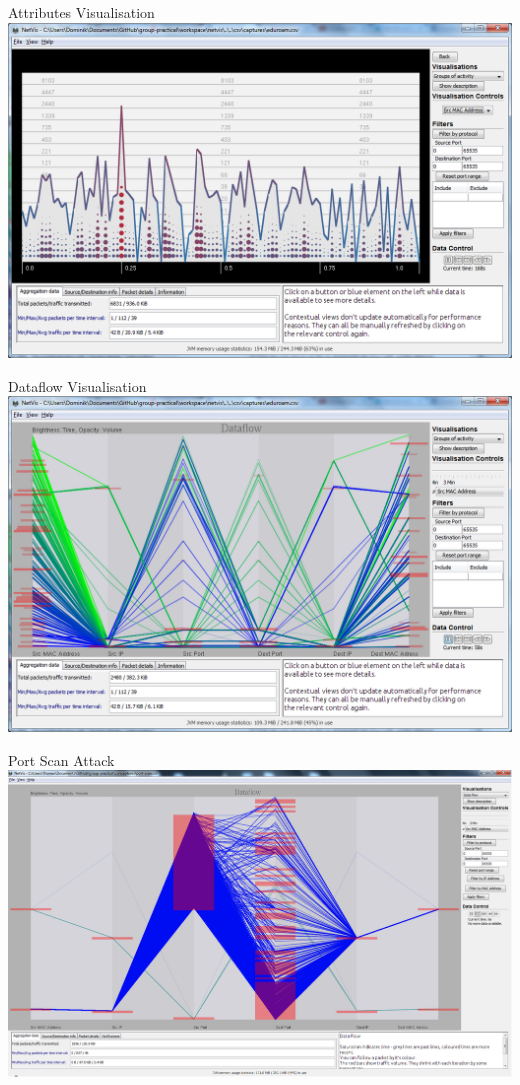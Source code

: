\documentclass{beamer}
\begin{document}
    \begin{frame}{Attributes Visualisation}
	\includegraphics[width=\textwidth,keepaspectratio]{img/Attributes.png}
    \end{frame}

    \begin{frame}{Dataflow Visualisation}
	\includegraphics[width=\textwidth,keepaspectratio]{img/Dataflow.png}
    \end{frame}

    \begin{frame}{Port Scan Attack}
	\includegraphics[width=\textwidth,keepaspectratio]{img/PortScanDataFlow.png}
    \end{frame}
\end{document}
